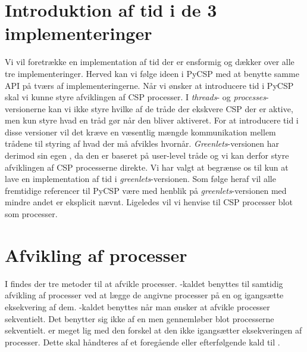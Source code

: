 \section{Introduktion af tid i de 3 implementeringer}
Vi vil foretrække en implementation af tid der er ensformig og dækker over alle tre implementeringer. Herved kan vi følge ideen i PyCSP med at benytte samme API på tværs af implementeringerne. Når vi ønsker at introducere tid i PyCSP skal vi kunne styre afviklingen af CSP processer. I  \emph{threads}- og \emph{processes}-versionerne kan vi ikke styre hvilke af de tråde der ekskvere CSP der er aktive, men kun styre hvad en tråd gør når den bliver aktiveret. For at introducere tid i disse versioner vil det kræve en væsentlig mængde kommunikation mellem trådene til styring af hvad der må afvikles hvornår. \emph{Greenlets}-versionen har derimod sin egen \sched , da den er baseret på user-level tråde og vi kan derfor styre afviklingen af CSP processerne direkte. Vi har valgt at begrænse os til kun at lave en implementation af tid i \emph{greenlets}-versionen. Som følge heraf vil alle fremtidige referencer til PyCSP være med henblik på \emph{greenlets}-versionen med mindre andet er eksplicit nævnt. Ligeledes vil vi henvise til CSP processer blot som processer. 

\section{Afvikling af processer}
I \pycsp findes der tre metoder til at afvikle processer. -kaldet benyttes til samtidig afvikling af processer ved at lægge de angivne processer på \sched en og igangsætte eksekvering af dem. -kaldet benyttes når man ønsker at afvikle processer sekventielt. Det benytter sig ikke af \sched en men gennemløber blot processerne sekventielt.  er meget lig  med den forskel at den ikke igangsætter eksekveringen af processer. Dette skal håndteres af et foregående eller efterfølgende kald til . 


